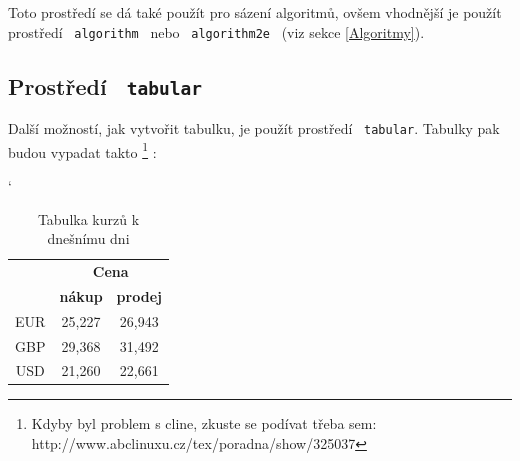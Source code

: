 \documentclass[11pt]{article}
\begin{document}
\noindent
Toto prostředí se dá také použít pro sázení algoritmů, ovšem vhodnější je použít 
prostředí \ \texttt{algorithm} \ nebo \ \texttt{algorithm2e} \ (viz sekce \ref{Algoritmy}).


\subsection{Prostředí \ \texttt{tabular}}
Další možností, jak vytvořit tabulku, je použít prostředí \ \texttt{tabular}. Tabulky pak 
budou vypadat takto
\footnote{Kdyby byl problem s cline, zkuste se podívat třeba sem: http://www.abclinuxu.cz/tex/poradna/show/325037}
:

\begin{table}[h!]
    \centering
    \catcode`
    \begin{tabular}{|c|c|c|}
    \cline{1-3}
    {\multirow{2}{*}{\textbf{Měna}}}                     & \multicolumn{2}{c|}{\textbf{Cena}}                                             \\ \cline{2-3}
                                                & \textbf{nákup}                             & \textbf{prodej}                            \\ \cline{1-3}
    EUR                                         & 25,227                            &  26,943                            \\
    GBP                                         & 29,368                            &  31,492                          \\
    USD                                         & 21,260                            &  22,661                       \\ \cline{1-3}
    \end{tabular}
    \caption{Tabulka kurzů k dnešnímu dni}
    \label{Tab1}
\end{table}
\end{document}

